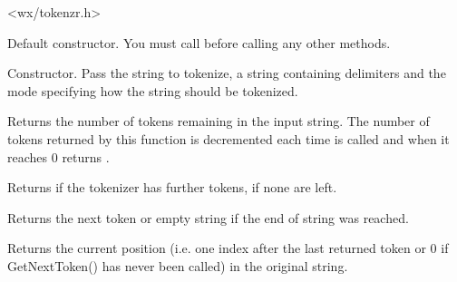 


<wx/tokenzr.h>



\label{wxstringtokenizerwxstringtokenizer}


Default constructor. You must call 
 before calling any other
methods.


Constructor. Pass the string to tokenize, a string containing delimiters
and the mode specifying how the string should be tokenized.


\label{wxstringtokenizercounttokens}


Returns the number of tokens remaining in the input string. The number of
tokens returned by this function is decremented each time 
 is called and when it
reaches $0$  returns
\false.


\label{wxstringtokenizerhasmoretokens}


Returns \true if the tokenizer has further tokens, \false if none are left.


\label{wxstringtokenizergetnexttoken}


Returns the next token or empty string if the end of string was reached.


\label{wxstringtokenizergetposition}


Returns the current position (i.e. one index after the last returned
token or 0 if GetNextToken() has never been called) in the original
string.


